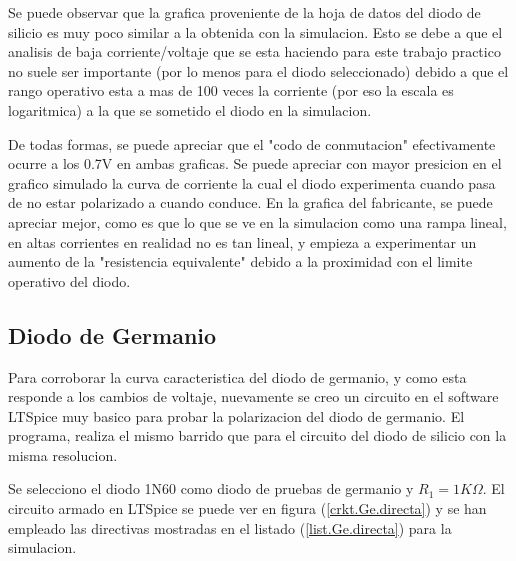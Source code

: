 \documentclass[chaptersright]{informeutn}
\begin{document}
        Se puede observar que la grafica proveniente de la hoja de datos del diodo de silicio \cite{DS0} es muy poco
        similar a la obtenida con la simulacion. Esto se debe a que el analisis de baja corriente/voltaje que se esta
        haciendo para este trabajo practico no suele ser importante (por lo menos para el diodo seleccionado) debido a
        que el rango operativo esta a mas de 100 veces la corriente (por eso la escala es logaritmica) a la que se
        sometido el diodo en la simulacion.

        De todas formas, se puede apreciar que el "codo de conmutacion" efectivamente ocurre a los 0.7V en ambas
        graficas. Se puede apreciar con mayor presicion en el grafico simulado la curva de corriente la cual
        el diodo experimenta cuando pasa de no estar polarizado a cuando conduce. En la grafica del fabricante, se
        puede apreciar mejor, como es que lo que se ve en la simulacion como una rampa lineal, en altas
        corrientes en realidad no es tan lineal, y empieza a experimentar un aumento de la "resistencia equivalente"
        debido a la proximidad con el limite operativo del diodo.

      \subsection{Diodo de Germanio}
        Para corroborar la curva caracteristica del diodo de germanio, y como esta responde a los cambios de voltaje,
        nuevamente se creo un circuito en el software LTSpice muy basico para probar la polarizacion del diodo de
        germanio. El programa, realiza el mismo barrido que para el circuito del diodo de silicio con la misma
        resolucion.

        Se selecciono el diodo 1N60 como diodo de pruebas de germanio y $R_1 = 1K\Omega$. El circuito armado en
        LTSpice se puede ver en figura (\ref{crkt.Ge.directa}) y se han empleado las directivas mostradas en el
        listado (\ref{list.Ge.directa}) para la simulacion.
\end{document}
